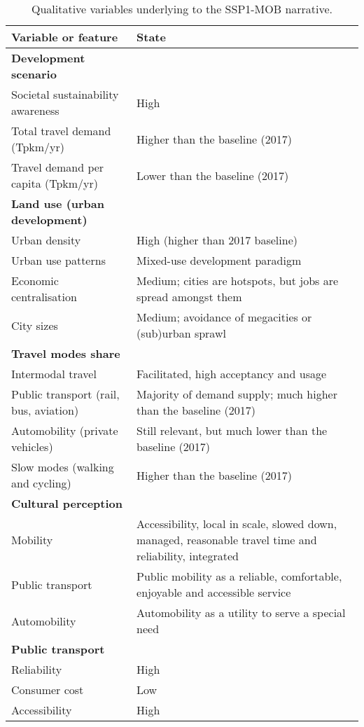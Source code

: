 \begin{table}
\centering
\caption[SSP1-MOB qualitative variables]{Qualitative variables underlying to the SSP1-MOB narrative.}
\label{t:ssp1-mob-2100-narrative-thesis}
\scriptsize
\begin{tabular}{p{4.5cm}p{9cm}}
\toprule
Variable or feature & State \\ \midrule
\textbf{Development scenario} &  \\
Societal sustainability awareness & High \\
Total travel demand (Tpkm/yr) & Higher than the baseline (2017) \\
Travel demand per capita (Tpkm/yr) & Lower than the baseline (2017) \\ \addlinespace
\textbf{Land use (urban development)} &  \\
Urban density & High (higher than 2017 baseline) \\
Urban use patterns & Mixed-use development paradigm \\
Economic centralisation & Medium; cities are hotspots, but jobs are spread amongst them \\
City sizes & Medium; avoidance of megacities or (sub)urban sprawl \\\addlinespace
\textbf{Travel modes share} &  \\
Intermodal travel & Facilitated, high acceptancy and usage \\
Public transport (rail, bus, aviation) & Majority of demand supply; much higher than the baseline (2017) \\
Automobility (private vehicles) & Still relevant, but much lower than the baseline (2017) \\
Slow modes (walking and cycling) & Higher than the baseline (2017) \\\addlinespace
\textbf{Cultural perception} &  \\
Mobility & Accessibility, local in scale, slowed down, managed, reasonable travel time and reliability, integrated \\
Public transport & Public mobility as a reliable, comfortable, enjoyable and accessible service \\
Automobility & Automobility as a utility to serve a special need \\\addlinespace
\textbf{Public transport} &  \\
Reliability & High \\
Consumer cost & Low \\
Accessibility & High \\

\end{tabular}
\end{table}
